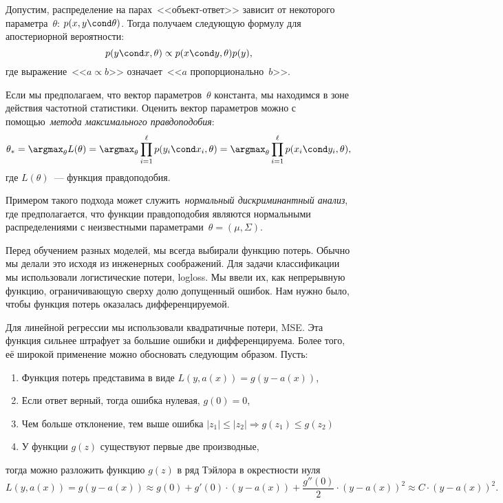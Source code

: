 \documentclass[12pt,fleqn]{article}
\begin{document}
Допустим, распределение на парах~<<объект-ответ>> зависит от
некоторого параметра~$\theta$: $p(x, y \cond \theta)$.
Тогда получаем следующую формулу для апостериорной вероятности:
\[
    p(y \cond x, \theta)
    \propto
    p(x \cond y, \theta) p(y),
\]
где выражение~<<$a \propto b$>> означает~<<$a$ пропорционально~$b$>>.

Если мы предполагаем, что вектор параметров~$\theta$ константа, мы находимся в зоне действия частотной статистики. Оценить вектор параметров можно с помощью~\emph{метода максимального правдоподобия}:
\[
    \theta_*
    =
    \argmax_\theta
        L(\theta)
    =
    \argmax_\theta
        \prod_{i = 1}^{\ell} p(y_i \cond x_i, \theta) =
    \argmax_\theta
        \prod_{i = 1}^{\ell} p(x_i \cond y_i, \theta),
\]
где $L(\theta)$~--- функция правдоподобия.

Примером такого подхода может служить~\emph{нормальный дискриминантный анализ}, где предполагается, что функции правдоподобия являются нормальными распределениями
с неизвестными параметрами~$\theta = (\mu, \Sigma)$.

Перед обучением разных моделей, мы всегда выбирали функцию потерь. Обычно мы делали это исходя из инженерных соображений. Для задачи классификации мы использовали логистические потери, logloss. Мы ввели их, как непрерывную функцию, ограничивающую сверху долю допущенный ошибок. Нам нужно было, чтобы функция потерь оказалась дифференцируемой. 

Для линейной регрессии мы использовали квадратичные потери, MSE. Эта функция сильнее штрафует за большие ошибки и дифференцируема. Более того, её широкой применение можно обосновать следующим образом. Пусть: 

\begin{enumerate} 
    \item Функция потерь представима в виде $L(y, a(x)) = g(y - a(x))$,
    \item\label{prop-2} Если ответ верный, тогда ошибка нулевая, $g(0) = 0$,
    \item\label{prop-3} Чем больше отклонение, тем выше ошибка $|z_1| \le |z_2| \Rightarrow g(z_1) \le g(z_2)$  
    \item У функции $g(z)$ существуют первые две производные,
\end{enumerate} тогда можно разложить функцию $g(z)$ в ряд Тэйлора в окрестности нуля
\[
L(y, a(x)) = g(y - a(x)) \approx g(0) + g'(0)\cdot(y - a(x)) + \frac{g''(0)}{2} \cdot (y - a(x))^2 \approx C \cdot (y - a(x))^2.
\]
\end{document}
